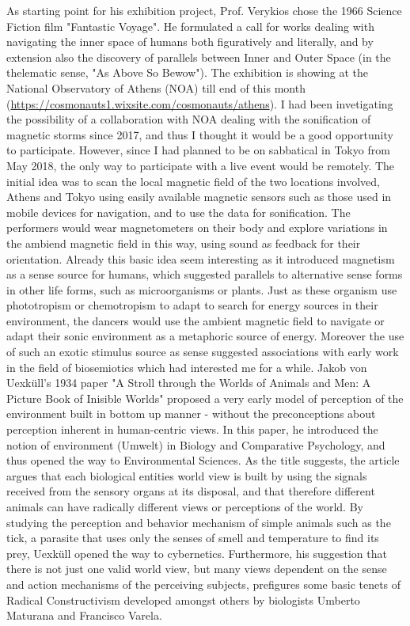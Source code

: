 \documentclass[11pt]{article}
\begin{document}
As starting point for his exhibition project, Prof. Verykios chose the 1966 Science Fiction film "Fantastic Voyage".  He formulated a call for works dealing with navigating the inner space of humans both figuratively and literally, and by extension also the discovery of parallels between Inner and Outer Space (in the thelematic sense, "As Above So Bewow").  The exhibition is showing at the National Observatory of Athens (NOA) till end of this month (\url{https://cosmonauts1.wixsite.com/cosmonauts/athens}).  I had been invetigating the possibility of a collaboration with NOA dealing with the sonification of magnetic storms since 2017, and thus I thought it would be a good opportunity to participate.  However, since I had planned to be on sabbatical in Tokyo from May 2018, the only way to participate with a live event would be remotely. The initial idea was to scan the local magnetic field of the two locations involved, Athens and Tokyo using easily available magnetic sensors such as those used in mobile devices for navigation, and to use the data for sonification.  The performers would wear magnetometers on their body and explore variations in the ambiend magnetic field in this way, using sound as feedback for their orientation.  Already this basic idea seem interesting as it introduced magnetism as a sense source for humans, which suggested parallels to alternative sense forms in other life forms, such as microorganisms or plants.  Just as these organism use phototropism or chemotropism to adapt to search for energy sources in their environment, the dancers would use the ambient magnetic field to navigate or adapt their sonic environment as a metaphoric source of energy.  Moreover the use of such an exotic stimulus source as sense suggested associations with early work in the field of biosemiotics which had interested me for a while.  Jakob von Uexküll's 1934 paper "A Stroll through the Worlds of Animals and Men: A Picture Book of Inisible Worlds" proposed a very early model of perception of the environment built in bottom up manner - without the preconceptions about perception inherent in human-centric views. In this paper, he introduced the notion of environment (Umwelt) in Biology and Comparative Psychology, and thus opened the way to Environmental Sciences.  As the title suggests, the article argues that each biological entities world view is built by using the signals received from the sensory organs at its disposal, and that therefore different animals can have radically different views or perceptions of the world.  By studying the perception and behavior mechanism of simple animals such as the tick, a parasite that uses only the senses of smell and temperature to find its prey, Uexküll opened the way to cybernetics.  Furthermore, his suggestion that there is not just one valid world view, but many views dependent on the sense and action mechanisms of the perceiving subjects, prefigures some basic tenets of Radical Constructivism developed amongst others by biologists Umberto Maturana and Francisco Varela.  
\end{document}
